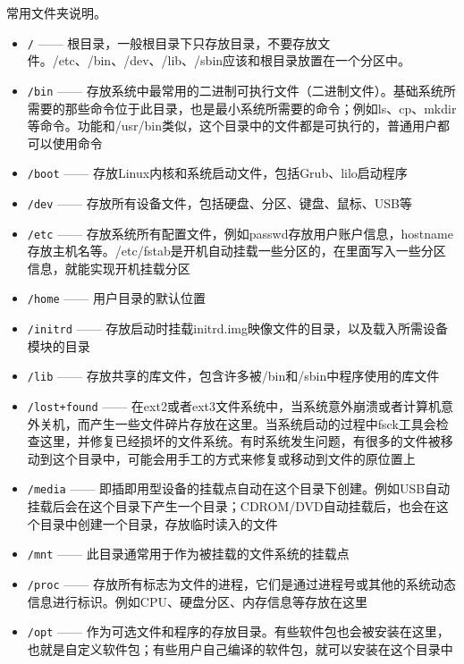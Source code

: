 \documentclass[doctor,openright,twoside]{sjtuthesis}
\providecommand{\tightlist}{%
    \setlength{\itemsep}{0pt}\setlength{\parskip}{0pt}}
\newcommand{\passthrough}[1]{#1}
\theoremstyle{plain}
\theoremstyle{definition}
\theoremstyle{remark}
\theoremstyle{ocrenumbox}
\theoremstyle{plain}
\begin{document}
常用文件夹说明。

\begin{itemize}
\tightlist
\item
  \passthrough{\lstinline!/!} ------ 根目录，一般根目录下只存放目录，不要存放文件。/etc、/bin、/dev、/lib、/sbin应该和根目录放置在一个分区中。
\item
  \passthrough{\lstinline!/bin!} ------ 存放系统中最常用的二进制可执行文件（二进制文件）。基础系统所需要的那些命令位于此目录，也是最小系统所需要的命令；例如ls、cp、mkdir等命令。功能和/usr/bin类似，这个目录中的文件都是可执行的，普通用户都可以使用命令
\item
  \passthrough{\lstinline!/boot!} ------ 存放Linux内核和系统启动文件，包括Grub、lilo启动程序
\item
  \passthrough{\lstinline!/dev!} ------ 存放所有设备文件，包括硬盘、分区、键盘、鼠标、USB等
\item
  \passthrough{\lstinline!/etc!} ------ 存放系统所有配置文件，例如passwd存放用户账户信息，hostname存放主机名等。/etc/fstab是开机自动挂载一些分区的，在里面写入一些分区信息，就能实现开机挂载分区
\item
  \passthrough{\lstinline!/home!} ------ 用户目录的默认位置
\item
  \passthrough{\lstinline!/initrd!} ------ 存放启动时挂载initrd.img映像文件的目录，以及载入所需设备模块的目录
\item
  \passthrough{\lstinline!/lib!} ------ 存放共享的库文件，包含许多被/bin和/sbin中程序使用的库文件
\item
  \passthrough{\lstinline!/lost+found!} ------ 在ext2或者ext3文件系统中，当系统意外崩溃或者计算机意外关机，而产生一些文件碎片存放在这里。当系统启动的过程中fsck工具会检查这里，并修复已经损坏的文件系统。有时系统发生问题，有很多的文件被移动到这个目录中，可能会用手工的方式来修复或移动到文件的原位置上
\item
  \passthrough{\lstinline!/media!} ------ 即插即用型设备的挂载点自动在这个目录下创建。例如USB自动挂载后会在这个目录下产生一个目录；CDROM/DVD自动挂载后，也会在这个目录中创建一个目录，存放临时读入的文件
\item
  \passthrough{\lstinline!/mnt!} ------ 此目录通常用于作为被挂载的文件系统的挂载点
\item
  \passthrough{\lstinline!/proc!} ------ 存放所有标志为文件的进程，它们是通过进程号或其他的系统动态信息进行标识。例如CPU、硬盘分区、内存信息等存放在这里
\item
  \passthrough{\lstinline!/opt!} ------ 作为可选文件和程序的存放目录。有些软件包也会被安装在这里，也就是自定义软件包；有些用户自己编译的软件包，就可以安装在这个目录中

\end{itemize}
\end{document}
